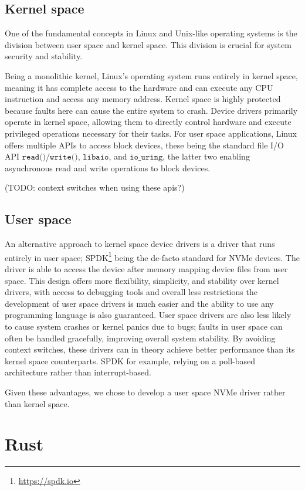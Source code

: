 \subsection{Kernel space}
One of the fundamental concepts in Linux and Unix-like operating systems is the division between user space and kernel space. This division is crucial for system security and stability.

Being a monolithic kernel, Linux's operating system runs entirely in kernel space, meaning it has complete access to the hardware and can execute any CPU instruction and access any memory address. Kernel space is highly protected because faults here can cause the entire system to crash. Device drivers primarily operate in kernel space, allowing them to directly control hardware and execute privileged operations necessary for their tasks. For user space applications, Linux offers multiple APIs to access block devices, these being the standard file I/O API $\texttt{read()}$/$\texttt{write()}$, $\texttt{libaio}$, and $\texttt{io\_uring}$, the latter two enabling asynchronous read and write operations to block devices.

(TODO: context switches when using these apis?)

\subsection{User space}
An alternative approach to kernel space device drivers is a driver that runs entirely in user space; SPDK\footnote{\url{https://spdk.io}} being the de-facto standard for NVMe devices. The driver is able to access the device after memory mapping device files from user space. This design offers more flexibility, simplicity, and stability over kernel drivers, with access to debugging tools and overall less restrictions the development of user space drivers is much easier and the ability to use any programming language is also guaranteed. User space drivers are also less likely to cause system crashes or kernel panics due to bugs; faults in user space can often be handled gracefully, improving overall system stability. By avoiding context switches, these drivers can in theory achieve better performance than its kernel space counterparts. SPDK for example, relying on a poll-based architecture rather than interrupt-based.

Given these advantages, we chose to develop a user space NVMe driver rather than kernel space.

\section{Rust}

